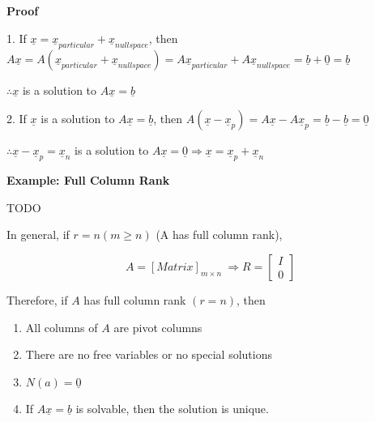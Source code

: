 \documentclass[12pt,a4paper]{article}
\begin{document}
\textbf{Proof} 

1. If $\underline{x} = \underline{x}_{particular} + \underline{x}_{nullspace}$, then 
$A\underline{x} = A(\underline{x}_{particular} + \underline{x}_{nullspace}) = A\underline{x}_{particular} + A\underline{x}_{nullspace} = \underline{b} + \underline{0} = \underline{b}$

$\therefore \underline{x}$ is a solution to $A\underline{x} = \underline{b}$

2. If $\underline{x}$ is a solution to $A\underline{x} = \underline{b}$, then
$A(\underline{x} - \underline{x}_p) = A\underline{x} - A\underline{x}_p = \underline{b} - \underline{b} = \underline{0}$

$\therefore \underline{x} - \underline{x}_p = \underline{x}_n$ is a solution to $A\underline{x} = \underline{0} \Rightarrow \underline{x} = \underline{x}_p + \underline{x}_n$


\textbf{Example: Full Column Rank}

TODO

In general, if $r = n (m\geq n)$ (A has full column rank), 

\[
A = [Matrix]_{m \times n}\ 
\Rightarrow 
R = 
\begin{bmatrix}
  I \\
  0
\end{bmatrix}
\]

Therefore, if $A$ has full column rank $(r=n)$, then 
\begin{enumerate}
  \item All columns of $A$ are pivot columns
  \item There are no free variables or no special solutions
  \item $N(a) = {\underline{0}}$
  \item If $A\underline{x} = \underline{b}$ is solvable, then the solution is unique.
\end{enumerate}
\end{document}
